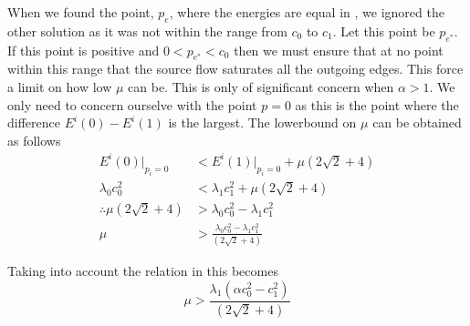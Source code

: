 \begin{definition}[Lowerbound on $\mu$]
	When we found the point, $p_e$, where the energies are equal in , we ignored the other solution as it was not within the range from $c_0$ to $c_1$. Let this point be $p_{e^*}$. If this point is positive and $0<p_{e^*}<c_0$ then we must ensure that at no point within this range that the source flow saturates all the outgoing edges. This force a limit on how low $\mu$ can be. This is only of significant concern when $\alpha>1$. We only need to concern ourselve with the point $p=0$ as this is the point where the difference $E^i(0)-E^i(1)$ is the largest. The lowerbound on $\mu$ can be obtained as follows
	\begin{equation*}\begin{split}
		E^i(0)|_{p_i=0} &< E^i(1)|_{p_i=0} + \mu \left( 2\sqrt{2} + 4\right) \\
		\lambda_0c_0^2 &< \lambda_1c_1^2 + \mu \left( 2\sqrt{2} + 4\right) \\
		\therefore \mu \left( 2\sqrt{2} + 4\right) &> \lambda_0c_0^2 - \lambda_1c_1^2\\
		\mu &> \frac{\lambda_0c_0^2 - \lambda_1c_1^2}{\left( 2\sqrt{2} + 4\right)}
	\end{split}\end{equation*} 
\end{definition}
Taking into account the relation in  this becomes
\begin{equation}
	\mu > \frac{\lambda_1(\alpha c_0^2-c_1^2)}{\left( 2\sqrt{2} + 4\right)}
	\label{eq:mulowerbound}
\end{equation}

